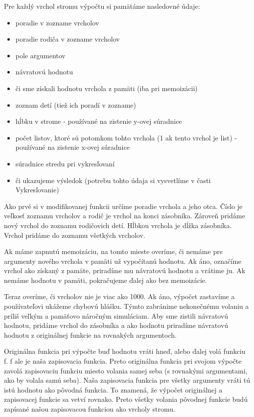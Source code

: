 Pre každý vrchol stromu výpočtu si pamätáme nasledovné údaje:

\begin{itemize}
  \item poradie v zozname vrcholov
  \item poradie rodiča v zozname vrcholov
  \item pole argumentov
  \item návratovú hodnotu
  \item či sme získali hodnotu vrchola z pamäti (iba pri memoizácii)
  \item zoznam detí (tiež ich poradí v zozname)
  \item hĺbku v strome - používané na zistenie y-ovej súradnice
  \item počet listov, ktoré sú potomkom tohto vrchola (1 ak tento vrchol je list) - používané na zistenie
    x-ovej súradnice
  \item súradnice stredu pri vykresľovaní
  \item či ukazujeme výsledok (potrebu tohto údaja si vysvetlíme v časti Vykresľovanie)
\end{itemize}

Ako prvé si v modifikovanej funkcii určíme poradie vrchola a jeho otca. Číslo
je veľkosť zoznamu vrcholov a rodič je vrchol na konci zásobníka. Zároveň pridáme
nový vrchol do zoznamu rodičovich detí. Hĺbkou vrchola je dĺžka zásobníka.
Vrchol pridáme do zoznamu všetkých vrcholov.

Ak máme zapnutú memoizáciu, na tomto mieste overíme, či nemáme pre argumenty nového
vrchola v pamäti už vypočítanú hodnotu. Ak áno, označíme vrchol ako získaný z pamäte, priradíme mu
návratovú hodnotu a vrátime ju. Ak nemáme hodnotu v pamäti, pokračujeme ďalej ako
bez memoizácie.

Teraz overíme, či vrcholov nie je viac ako 1000. Ak áno, výpočet zastavíme
a používateľovi ukážeme chybovú hlášku. Týmto zabránime nekonečnému volaniu a príliš
veľkým a pamäťovo náročným simuláciam.
\newline
\newline
Aby sme zistili návratovú hodnotu, pridáme vrchol do zásobníka a ako
hodnotu priradíme návratovú hodnotu z originálnej funkcie na rovnakých argumentoch.

Originálna funkcia pri výpočte
buď hodnotu vráti hneď, alebo ďalej volá funkciu f. f ale je naša zapisovacia
funkcia. Preto originálna funkcia pri svojom výpočte zavolá zapisovaciu funkciu
miesto volania samej seba (s rovnakými argumentami, ako by volala samú seba).
Naša zapisovacia funkcia pre všetky argumenty vráti tú istú hodnotu ako pôvodná funkcia.
To znamená, že výpočet originálnej a zapisovacej funkcie sa vetví rovnako.
Preto všetky volania pôvodnej funkcie budú zapísané našou zapisovacou funkciou ako
vrcholy stromu.

